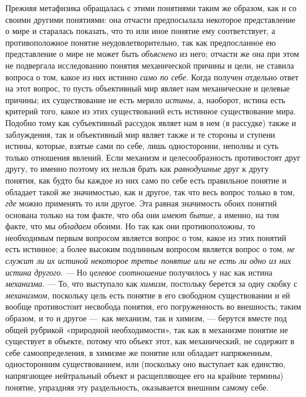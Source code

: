 \documentclass[twoside]{article}
\begin{document}
{{{{Прежняя метафизика обращалась с этими понятиями таким же
образом, как и со своими другими понятиями: она отчасти предпосылала
некоторое представление о мире и старалась показать, что то или иное
понятие ему соответствует, а противоположное понятие неудовлетворительно,
так как предпосланное ею представление о мире не может быть
{\em объяснено} из него;
отчасти же она при этом не подвергала исследованию понятия механической
причины и цели, не ставила вопроса о том, какое из них истинно
{\em само по себе}. Когда
получен отдельно ответ на этот вопрос, то пусть объективный мир являет нам
механические и целевые причины; их существование не есть мерило
{\em истины}, а,
наоборот, истина есть критерий того, какое из этих существований есть
истинное существование мира. Подобно тому как субъективный рассудок являет
нам в нем (в рассудке) также и заблуждения, так и объективный мир являет
также и те стороны и ступени истины, которые, взятые сами по себе, лишь
односторонни, неполны и суть только отношения явлений. Если механизм и
целесообразность противостоят друг другу, то именно поэтому их нельзя брать
как {\em равнодушные}
друг к другу понятия, как будто бы каждое из них само по себе
есть правильное понятие и обладает такой же значимостью, как и другое, так
что весь вопрос только в том, {\em где}
можно применять то или другое. Эта равная
значимость обоих понятий основана только на том факте, что
оба они {\em имеют бытие},
а именно, на том факте, что мы
{\em обладаем} обоими. Но
так как они противоположны, то необходимым первым вопросом является вопрос
о том, какое из этих понятий есть истинное; а более высоким подлинным
вопросом является вопрос о том, {\em не
служит ли их истиной некоторое третье понятие или не есть ли одно из них
истина другого}. — Но
{\em целевое соотношение}
получилось у нас как истина
{\em механизма}. — То,
что выступало как {\em химизм},
постольку берется за одну скобку с
{\em механизмом},
поскольку цель есть понятие в его свободном существовании и
ей вообще противостоит несвобода понятия, его погруженность во внешность;
таким образом, и то и другое —~как механизм, так и химизм,
— берутся вместе под общей рубрикой «природной
необходимости», так как в механизме понятие не существует в объекте, потому
что объект этот, как механический, не содержит в себе самоопределения, в
химизме же понятие или обладает напряженным, односторонним существованием,
или (поскольку оно выступает как единство, напрягающее нейтральный объект и
расщепляющее его на крайние термины) понятие, упраздняя эту раздельность,
оказывается внешним самому себе.

}}}}
\end{document}
